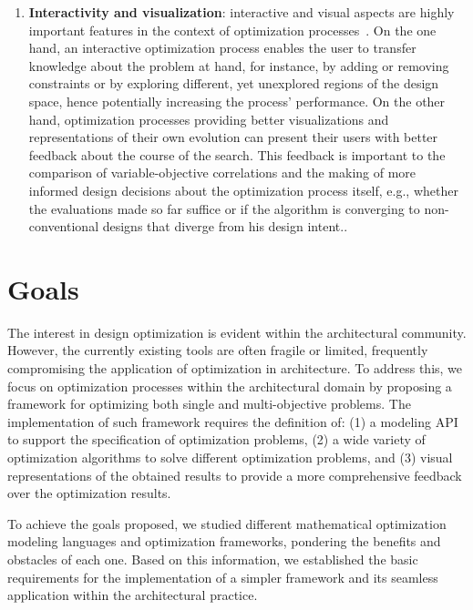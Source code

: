 \begin{enumerate}
\item \textbf{Interactivity and visualization}: interactive and visual aspects are highly important features in the context of optimization processes~\cite{Ashour2015CreativelyMOO}. On the one hand, an interactive optimization process enables the user to transfer knowledge about the problem at hand, for instance, by adding or removing constraints or by exploring different, yet unexplored regions of the design space, hence potentially increasing the process' performance. On the other hand, optimization processes providing better visualizations and representations of their own evolution can present their users with better feedback about the course of the search. This feedback is important to the comparison of variable-objective correlations and the making of more informed design decisions about the optimization process itself, e.g., whether the evaluations made so far suffice or if the algorithm is converging to non-conventional designs that diverge from his design intent..
\end{enumerate}


\section{Goals}
The interest in design optimization is evident within the architectural community. However, the currently existing tools are often fragile or limited, frequently compromising the application of optimization in architecture. To address this, we focus on optimization processes within the architectural domain by proposing a framework for optimizing both single and multi-objective problems. The implementation of such framework requires the definition of: (1) a modeling \ac{API} to support the specification of optimization problems, (2) a wide variety of optimization algorithms to solve different optimization problems, and (3) visual representations of the obtained results to provide a more comprehensive feedback over the optimization results.

To achieve the goals proposed, we studied different mathematical optimization modeling languages and optimization frameworks, pondering the benefits and obstacles of each one. Based on this information, we established the basic requirements for the implementation of a simpler framework and its seamless application within the architectural practice. 

